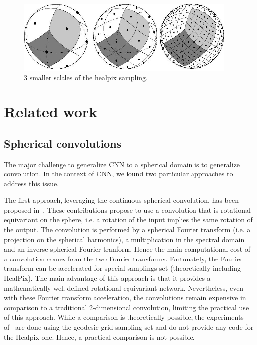 \documentclass[preprint,12pt,authoryear]{elsarticle}
\newcommand{\1}{\b{1}}              %
\newcommand{\0}{\b{0}}              %
\begin{document}
\begin{figure}[!ht]
\centering
\includegraphics[width=0.95\textwidth]{figures/healpix-3layers.jpg}
\caption{3 smaller sclales of the healpix sampling.}
\label{fig:healpix_sampling}
\end{figure}

\section{Related work}
\label{sec:related}



\subsection{Spherical convolutions} 
The major challenge to generalize CNN to a
spherical domain is to generalize convolution. In the context of CNN, we found
two particular approaches to address this issue.

The first approach, leveraging the continuous spherical convolution, has been
proposed in~\cite{cohen2017convolutional,cohen2018spherical}. These
contributions propose to use a convolution that is rotational equivariant on the
sphere, i.e. a rotation of the input implies the same rotation of the output.
The convolution is performed by a spherical Fourier transform (i.e. a projection
on the spherical harmonics), a  multiplication in the spectral domain and an
inverse spherical Fourier tranform. Hence the main computational cost of a
convolution comes from the two Fourier transforms. Fortunately, the Fourier
transform can be accelerated for special samplings set (theoretically including
HealPix). The main advantage of this approach is that it provides a
mathematically well defined rotational equivariant network. Nevertheless, even
with these Fourier transform acceleration, the convolutions remain expensive in
comparison to a traditional 2-dimensional convolution, limiting the practical use of this
approach. While a comparison is theoretically possible, the experiments
of~\cite{cohen2018spherical} are done using the geodesic grid sampling set and
do not provide any code for the Healpix one. Hence, a practical comparison is
not possible.
\end{document}
